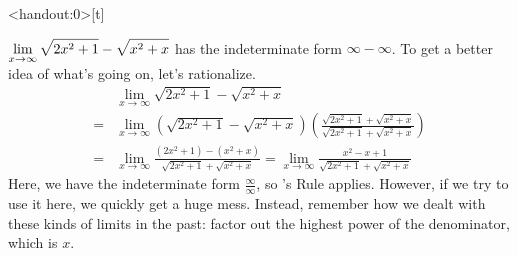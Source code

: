 \begin{frame}<handout:0>[t]

\pause



\color{answercolor}

$\displaystyle\lim_{x \to \infty}\sqrt{2x^2+1}-\sqrt{x^2+x}$ has the indeterminate form $\infty - \infty$. To get a better idea of what's going on, let's rationalize.
\begin{align*}
&\lim_{x \to \infty}\sqrt{2x^2+1}-\sqrt{x^2+x}\\
=&
\lim_{x \to \infty}\left(\sqrt{2x^2+1}-\sqrt{x^2+x}\right)\left(
\frac{\sqrt{2x^2+1}+\sqrt{x^2+x}}{\sqrt{2x^2+1}+\sqrt{x^2+x}}\right)\\
=&\lim_{x \to \infty}
\frac{(2x^2+1)-(x^2+x)}{\sqrt{2x^2+1}+\sqrt{x^2+x}}=
\lim_{x \to \infty}
\frac{x^2-x+1}{\sqrt{2x^2+1}+\sqrt{x^2+x}}
\end{align*}
Here, we have the indeterminate form $\frac{\infty}{\infty}$, so \hosp's Rule applies. However, if we try to use it here, we quickly get a huge mess. Instead, remember how we dealt with these kinds of limits in the past: factor out the highest power of the denominator, which is $x$.
\end{frame}

